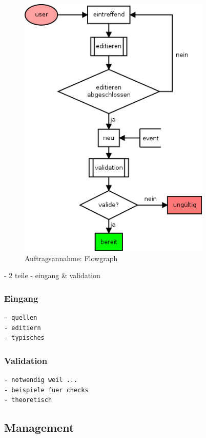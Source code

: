 \begin{figure}[ht]
  \centering
  \label{fig:lebenszyklus-auftrag-eingang}
  \includegraphics[height=5in]{imageinput/lebenszyklus-auftrag-eingang.png}
  \caption{Auftragsannahme: Flowgraph}
\end{figure}

- 2 teile
- eingang \& validation


\subsubsection{Eingang}

\begin{verbatim}
- quellen
- editiern
- typisches
\end{verbatim}

\subsubsection{Validation}
\begin{verbatim}
- notwendig weil ...
- beispiele fuer checks
- theoretisch
\end{verbatim}


\subsection{Management}

